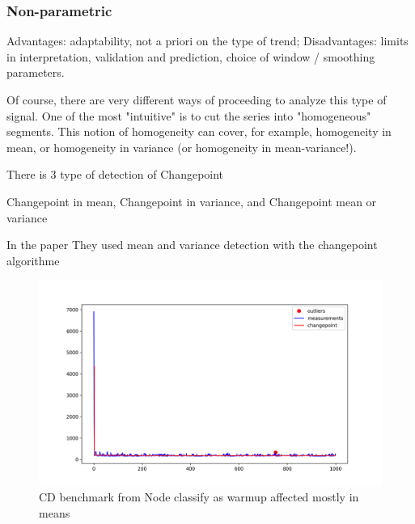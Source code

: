\documentclass{article}
\begin{document}
\subsubsection{Non-parametric}


Advantages: adaptability, not a priori on the type of trend;
Disadvantages: limits in interpretation, validation and prediction,
choice of window / smoothing parameters.



Of course, there are very different ways of proceeding to analyze this type of signal. One of the most "intuitive" is to cut the series into "homogeneous" segments. This notion of homogeneity can cover, for example, homogeneity in mean, or homogeneity in variance (or homogeneity in mean-variance!).

There is 3 type of detection of Changepoint

Changepoint in mean, Changepoint in variance, and Changepoint mean or variance

In the paper \cite{barrett2017virtual} They used mean and variance detection with the changepoint algorithme



\begin{figure}[h!]
    \centering
    \includegraphics[width=1\textwidth]{images/plot_6_flat.png}
    \caption{CD benchmark from Node classify as warmup affected mostly in means}
    \label{fig:bench_node_flat}
\end{figure}
\end{document}

